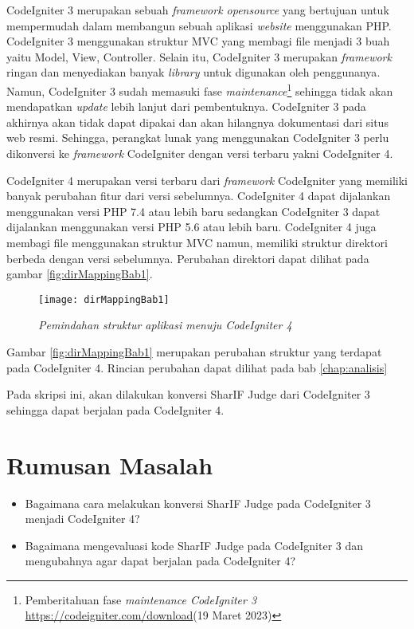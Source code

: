 CodeIgniter 3 merupakan sebuah \textit{framework opensource} yang bertujuan untuk mempermudah dalam membangun sebuah aplikasi \textit{website} menggunakan PHP. CodeIgniter 3 menggunakan struktur MVC yang membagi file menjadi 3 buah yaitu Model, View, Controller. Selain itu, CodeIgniter 3 merupakan \textit{framework} ringan dan menyediakan banyak \textit{library} untuk digunakan oleh penggunanya\cite{ci3:22}. Namun, CodeIgniter 3 sudah memasuki fase \textit{maintenance}\footnote{Pemberitahuan fase \textit{maintenance CodeIgniter 3} \url{https://codeigniter.com/download}(19 Maret 2023)} sehingga tidak akan mendapatkan \textit{update} lebih lanjut dari pembentuknya. CodeIgniter 3 pada akhirnya akan tidak dapat dipakai dan akan hilangnya dokumentasi dari situs web resmi. Sehingga, perangkat lunak yang menggunakan CodeIgniter 3 perlu dikonversi ke \textit{framework} CodeIgniter dengan versi terbaru yakni CodeIgniter 4.

CodeIgniter 4 merupakan versi terbaru dari \textit{framework} CodeIgniter yang memiliki banyak perubahan fitur dari versi sebelumnya. CodeIgniter 4 dapat dijalankan menggunakan versi PHP 7.4 atau lebih baru sedangkan CodeIgniter 3 dapat dijalankan menggunakan versi PHP 5.6 atau lebih baru. CodeIgniter 4 juga membagi file menggunakan struktur MVC namun, memiliki struktur direktori berbeda dengan versi sebelumnya\cite{codeigniter:23:ci4}. Perubahan direktori dapat dilihat pada gambar \ref{fig:dirMappingBab1}.
\begin{figure}[H]
	\centering  
	\texttt{[image: dirMappingBab1]}  
	\caption[\textit{Pemindahan struktur aplikasi menuju \textit{CodeIgniter 4}}]{\textit{Pemindahan struktur aplikasi menuju \textit{CodeIgniter 4}}} 
	\label{fig:dirMapping} 
\end{figure}

Gambar \ref{fig:dirMappingBab1} merupakan perubahan struktur yang terdapat pada CodeIgniter 4. Rincian perubahan dapat dilihat pada bab \ref{chap:analisis}

Pada skripsi ini, akan dilakukan konversi SharIF Judge dari CodeIgniter 3 sehingga dapat berjalan pada CodeIgniter 4.

\section{Rumusan Masalah}
\label{sec:rumusan}
\begin{itemize}
	\item Bagaimana cara melakukan konversi SharIF Judge pada CodeIgniter 3 menjadi CodeIgniter 4?
	\item Bagaimana mengevaluasi kode SharIF Judge pada CodeIgniter 3 dan mengubahnya agar dapat berjalan pada CodeIgniter 4?
\end{itemize}
